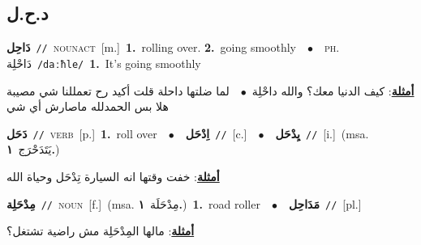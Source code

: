 \documentclass[10pt,a4paper,twoside]{article} %
\begin{document}
\begin{multicols}{2}
\vspace{-3mm}
\subsection*{\color{blue}\foreignlanguage{arabic}{د.ح.ل}\color{blue}{}} 

{\setlength\topsep{0pt}\textbf{\foreignlanguage{arabic}{دَاحِل}}\ {\color{gray}\texttt{//}\color{black}}\ \textsc{noun\textunderscore act}\ [m.]\ \textbf{1.}~rolling over.  \textbf{2.}~going smoothly\ \ $\bullet$\ \ \textsc{ph.} \color{gray} \foreignlanguage{arabic}{دَاحْلِة}\color{black}\ {\color{gray}\texttt{/{\sffamily daːħle}/}\color{black}}\ \textbf{1.}~It's going smoothly\  \begin{flushright}\color{gray}\foreignlanguage{arabic}{\textbf{\underline{\foreignlanguage{arabic}{أمثلة}}}: كيف الدنيا معك؟ والله داحْلِة\ $\bullet$\ \  لما ضلتها داحلة قلت أكيد رح تعمللنا شي مصيبة هلا بس الحمدلله ماصارش أي شي}\end{flushright}\color{black}} \vspace{2mm}

{\setlength\topsep{0pt}\textbf{\foreignlanguage{arabic}{دَحَل}}\ {\color{gray}\texttt{//}\color{black}}\ \textsc{verb}\ [p.]\ \textbf{1.}~roll over\ \ $\bullet$\ \ \setlength\topsep{0pt}\textbf{\foreignlanguage{arabic}{اِدْحَل}}\ {\color{gray}\texttt{//}\color{black}}\ [c.]\ \ $\bullet$\ \ \setlength\topsep{0pt}\textbf{\foreignlanguage{arabic}{يِدْحَل}}\ {\color{gray}\texttt{//}\color{black}}\ [i.]\ \color{gray}(msa. \foreignlanguage{arabic}{يَتَدَحْرَج}~\foreignlanguage{arabic}{\textbf{١.}})\color{black}\  \begin{flushright}\color{gray}\foreignlanguage{arabic}{\textbf{\underline{\foreignlanguage{arabic}{أمثلة}}}: خفت وقتها انه السيارة تِدْحَل وحياة الله}\end{flushright}\color{black}} \vspace{2mm}

{\setlength\topsep{0pt}\textbf{\foreignlanguage{arabic}{مِدْحَلِة}}\ {\color{gray}\texttt{//}\color{black}}\ \textsc{noun}\ [f.]\ \color{gray}(msa. \foreignlanguage{arabic}{مِدْحَلَة}~\foreignlanguage{arabic}{\textbf{١.}})\color{black}\ \textbf{1.}~road roller\ \ $\bullet$\ \ \setlength\topsep{0pt}\textbf{\foreignlanguage{arabic}{مَدَاحِل}}\ {\color{gray}\texttt{//}\color{black}}\ [pl.]\  \begin{flushright}\color{gray}\foreignlanguage{arabic}{\textbf{\underline{\foreignlanguage{arabic}{أمثلة}}}: مالها المِدْحَلِة مش راضية تشتغل؟}\end{flushright}\color{black}} \vspace{2mm}


\end{multicols}
\end{document}
